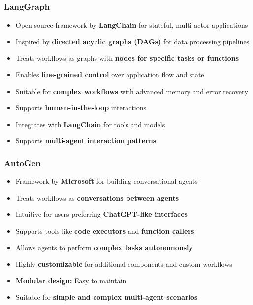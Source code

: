 \begin{frame}[fragile]\frametitle{LangGraph}
\begin{itemize}
    \item Open-source framework by \textbf{LangChain} for stateful, multi-actor applications
    \item Inspired by \textbf{directed acyclic graphs (DAGs)} for data processing pipelines
    \item Treats workflows as graphs with \textbf{nodes for specific tasks or functions}
    \item Enables \textbf{fine-grained control} over application flow and state
    \item Suitable for \textbf{complex workflows} with advanced memory and error recovery
    \item Supports \textbf{human-in-the-loop} interactions
    \item Integrates with \textbf{LangChain} for tools and models
    \item Supports \textbf{multi-agent interaction patterns}
\end{itemize}
\end{frame}

\begin{frame}[fragile]\frametitle{AutoGen}
\begin{itemize}
    \item Framework by \textbf{Microsoft} for building conversational agents
    \item Treats workflows as \textbf{conversations between agents}
    \item Intuitive for users preferring \textbf{ChatGPT-like interfaces}
    \item Supports tools like \textbf{code executors} and \textbf{function callers}
    \item Allows agents to perform \textbf{complex tasks autonomously}
    \item Highly \textbf{customizable} for additional components and custom workflows
    \item \textbf{Modular design:} Easy to maintain
    \item Suitable for \textbf{simple and complex multi-agent scenarios}
\end{itemize}
\end{frame}

